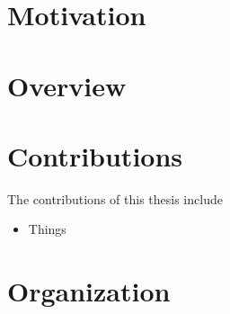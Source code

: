 \section{Motivation}


\section{Overview}


\section{Contributions}

The contributions of this thesis include
\begin{itemize}
  \item Things
\end{itemize}


\section{Organization}

